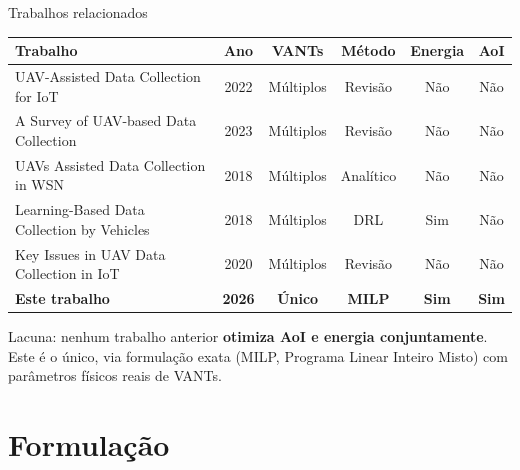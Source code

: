 \documentclass[aspectratio=169,11pt]{beamer}
\begin{document}
\begin{frame}{Trabalhos relacionados}
  \begin{center}
  \scriptsize
  \begin{tabular}{p{5.3cm} c c c c c}
    \toprule
    \textbf{Trabalho} & \textbf{Ano} & \textbf{VANTs} & \textbf{Método} & \textbf{Energia} & \textbf{AoI} \\
    \midrule
    UAV-Assisted Data Collection for IoT           & 2022 & Múltiplos & Revisão   & Não & Não \\
    A Survey of UAV-based Data Collection          & 2023 & Múltiplos & Revisão   & Não & Não \\
    UAVs Assisted Data Collection in WSN           & 2018 & Múltiplos & Analítico & Não & Não \\
    Learning-Based Data Collection by Vehicles     & 2018 & Múltiplos & DRL       & Sim & Não \\
    Key Issues in UAV Data Collection in IoT       & 2020 & Múltiplos & Revisão   & Não & Não \\
    \midrule
    \textbf{Este trabalho} & \textbf{2026} & \textbf{Único} & \textbf{MILP} & \textbf{Sim} & \textbf{Sim} \\
    \bottomrule
  \end{tabular}
  \end{center}
  \vspace{0.5em}
  Lacuna: nenhum trabalho anterior \textbf{otimiza AoI e energia conjuntamente}. Este é o único, via formulação exata (MILP, Programa Linear Inteiro Misto) com parâmetros físicos reais de VANTs.
\end{frame}

\section{Formulação}
\end{document}
